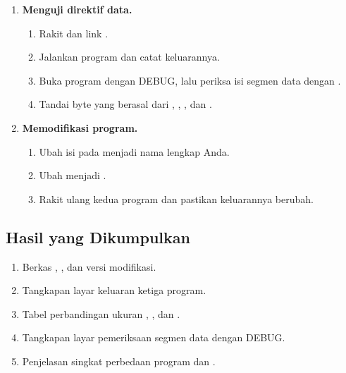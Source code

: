 \begin{enumerate}
    \item \textbf{Menguji direktif data.}
    \begin{enumerate}
        \item Rakit dan link .
        \item Jalankan program dan catat keluarannya.
        \item Buka program dengan DEBUG, lalu periksa isi segmen
              data dengan .
        \item Tandai byte yang berasal dari , ,
              , dan .
    \end{enumerate}

    \item \textbf{Memodifikasi program.}
    \begin{enumerate}
        \item Ubah isi  pada  menjadi
              nama lengkap Anda.
        \item Ubah  menjadi
              .
        \item Rakit ulang kedua program dan pastikan keluarannya
              berubah.
    \end{enumerate}
\end{enumerate}

\subsection{Hasil yang Dikumpulkan}

\begin{enumerate}
    \item Berkas , , dan
           versi modifikasi.
    \item Tangkapan layar keluaran ketiga program.
    \item Tabel perbandingan ukuran , , dan
          .
    \item Tangkapan layar pemeriksaan segmen data dengan DEBUG.
    \item Penjelasan singkat perbedaan program  dan
          .
\end{enumerate}

